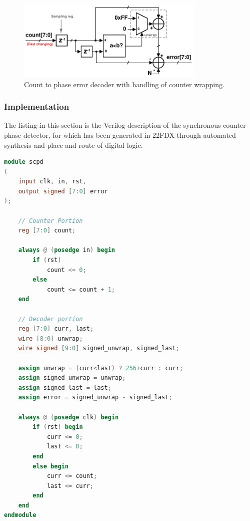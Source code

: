 			\begin{figure}[htb!]
			        \centering
			        \includegraphics[width=0.8\textwidth, angle=0]{./figs/sc_decoder}
			    \caption{Count to phase error decoder with handling of counter wrapping.}
			    \label{fig:sc_decoder}
			\end{figure}


	\subsubsection{Implementation}
	The listing in this section is the Verilog description of the synchronous counter phase detector, for which has been generated in 22FDX through automated synthesis and place and route of digital logic. 
	\begin{lstlisting}[language={Verilog}, caption={Synchronous counter phase detector (SCPD) hardware description.}, label={sim_code}]
module scpd
(
	input clk, in, rst,
	output signed [7:0] error
);

	// Counter Portion
	reg [7:0] count;

	always @ (posedge in) begin
		if (rst)
			count <= 0;
		else
			count <= count + 1;
	end

	// Decoder portion
	reg [7:0] curr, last;
	wire [8:0] unwrap;
	wire signed [9:0] signed_unwrap, signed_last; 
	
	assign unwrap = (curr<last) ? 256+curr : curr;
	assign signed_unwrap = unwrap;
	assign signed_last = last;
	assign error = signed_unwrap - signed_last;
	
	always @ (posedge clk) begin
		if (rst) begin
			curr <= 0;
			last <= 0;
		end 
		else begin
			curr <= count;
			last <= curr;
		end
	end
endmodule
	    \end{lstlisting}

\FloatBarrier



	\FloatBarrier\pagebreak
